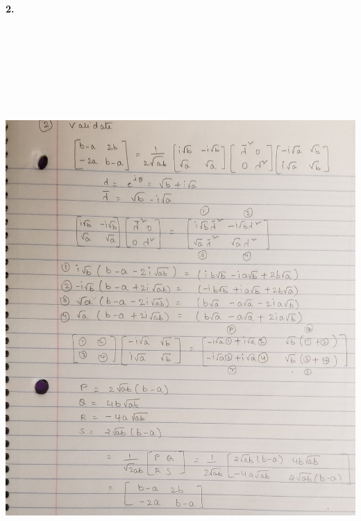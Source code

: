 \documentclass [12pt]{article}
\theoremstyle{definition}
\begin{document}
{\bf 2.} \\
\includegraphics[width=18cm, height=23cm]{I11}
\end{document}
